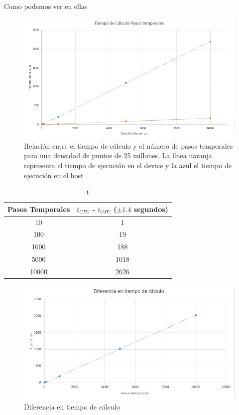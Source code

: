 \documentclass[11pt,a4paper,twoside,pdf]{article}
\numberwithin{equation}{section}
\begin{document}
Como podemos ver en ellas

\begin{figure}[h]
\centering
\includegraphics[width=15 cm]{T-Pasos_temporales.jpg}				
\caption{Relación entre el tiempo de cálculo y el número de pasos temporales para una densidad de puntos de 25 millones. La línea naranja representa el tiempo de ejecución en el device y la azul el tiempo de ejecución en el host}
\label{fig:t-pasos_temporales}
\end{figure}
\noindent




\begin{table}[h]
    \centering
    \begin{tabular}{|c|c|}
    \hline
         Pasos Temporales &  $t_{CPU}$ - $t_{GPU}$ ($\pm 1.4$ segundos)   \\ \hline \hline
         10 & 1  \\ \hline
          100 & 19  \\ \hline
          1000 & 188  \\ \hline
          5000 & 1018  \\ \hline
          10000 & 2626  \\ \hline
    \end{tabular}
    \caption{t}
    \label{tab:1}
\end{table}

\begin{figure}[h]
\centering
\includegraphics[width=15 cm]{DiferenciaEntiempoDeCalculo.jpg}				
\caption{Diferencia en tiempo de cálculo}
\label{fig:diferencia_en_tiempo_de_calculo}
\end{figure}
\noindent
\end{document}

